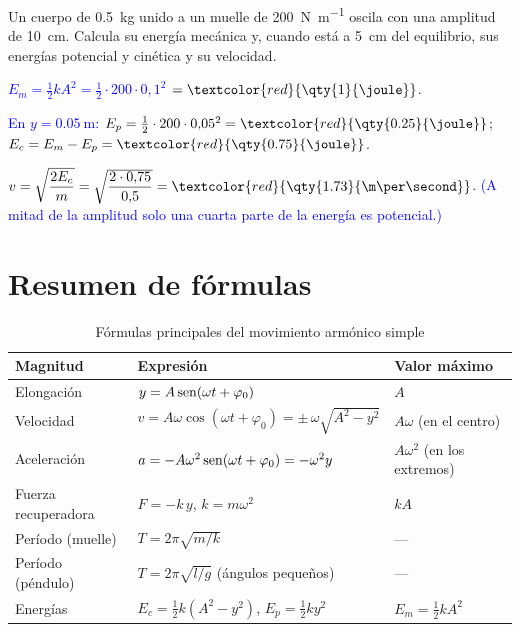 \begin{exercise}
    Un cuerpo de \qty{0.5}{\kg} unido a un muelle de \qty{200}{\newton\per\m} oscila con una amplitud de \qty{10}{\cm}.
    Calcula su energía mecánica y, cuando está a \qty{5}{\cm} del equilibrio, sus energías potencial y cinética y su velocidad.
    \begin{solu}
        \textcolor{blue}{\(E_m = \frac{1}{2}kA^2 = \frac{1}{2}\cdot 200\cdot 0{,}1^2\)} \(= \textcolor{red}{\qty{1}{\joule}}\).

        \textcolor{blue}{En \(y = \qty{0.05}{\m}\):} \(E_p = \frac{1}{2}\cdot 200\cdot 0{,}05^2 = \textcolor{red}{\qty{0.25}{\joule}}\);
        \(E_c = E_m - E_p = \textcolor{red}{\qty{0.75}{\joule}}\).

        \(v = \sqrt{\dfrac{2E_c}{m}} = \sqrt{\dfrac{2\cdot 0{,}75}{0{,}5}} = \textcolor{red}{\qty{1.73}{\m\per\second}}\).
        \textcolor{blue}{(A mitad de la amplitud solo una cuarta parte de la energía es potencial.)}
    \end{solu}
\end{exercise}

\section{Resumen de fórmulas}\label{sec:mas-resumen}

\begin{table}[H]
    \centering
    \caption{Fórmulas principales del movimiento armónico simple}
    \vspace{-5pt}
    \begin{tabular}{@{}lll@{}}
        \toprule
        \textbf{Magnitud} & \textbf{Expresión} & \textbf{Valor máximo} \\
        \midrule
        Elongación & \(y = A\operatorname{sen}(\omega t + \varphi_0)\) & \(A\) \\[3pt]
        Velocidad & \(v = A\omega\cos(\omega t + \varphi_0) = \pm\,\omega\sqrt{A^2 - y^2}\) & \(A\omega\) (en el centro) \\[3pt]
        Aceleración & \(a = -A\omega^2\operatorname{sen}(\omega t + \varphi_0) = -\omega^2 y\) & \(A\omega^2\) (en los extremos) \\[3pt]
        Fuerza recuperadora & \(F = -k\,y\), \quad \(k = m\omega^2\) & \(kA\) \\[3pt]
        Período (muelle) & \(T = 2\pi\sqrt{m/k}\) & --- \\[3pt]
        Período (péndulo) & \(T = 2\pi\sqrt{l/g}\) \quad (ángulos pequeños) & --- \\[3pt]
        Energías & \(E_c = \frac{1}{2}k(A^2 - y^2)\), \quad \(E_p = \frac{1}{2}k y^2\) & \(E_m = \frac{1}{2}kA^2\) \\
        \bottomrule
    \end{tabular}
    \label{tab:mas-resumen}
\end{table}

